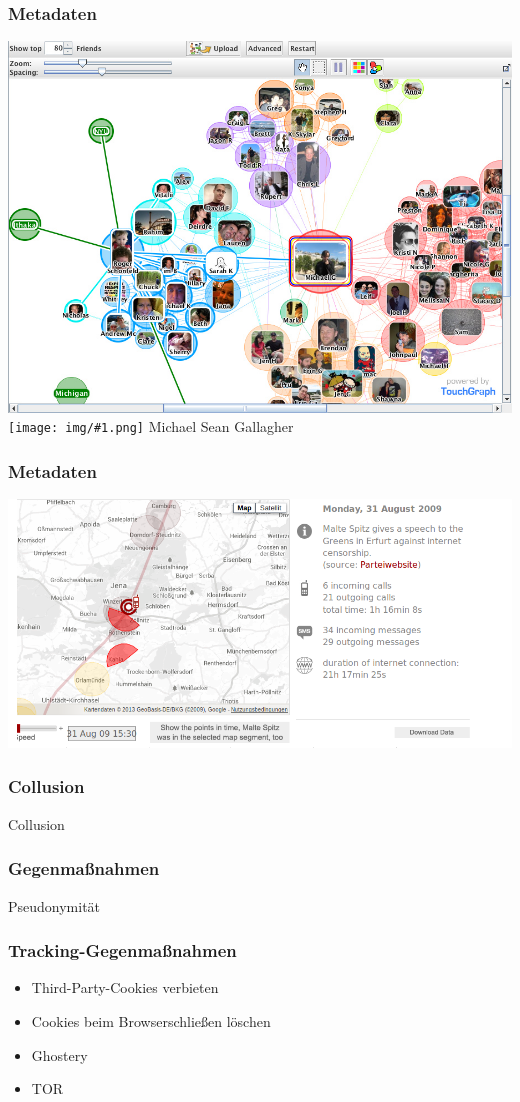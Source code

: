 \documentclass[12pt]{beamer}
\newcommand{\cc}[1]{\texttt{[image: img/\#1.png]}}
\begin{document}
\begin{frame}
    \frametitle{Metadaten}
    \includegraphics[height=0.7\textheight]{img/socialgraph.jpg}
    \cc{by-sa} Michael Sean Gallagher
\end{frame}

\begin{frame}
    \frametitle{Metadaten}
    \includegraphics[height=0.7\textheight]{img/maltespitz.png}
\end{frame}

\begin{frame}
    \frametitle{Collusion}
    \begin{center} \Large Collusion \end{center}
\end{frame}

\begin{frame}
    \frametitle{Gegenmaßnahmen}
    \begin{center} \Large Pseudonymität \end{center}
\end{frame}

\begin{frame}
    \frametitle{Tracking-Gegenmaßnahmen}
    \begin{itemize}
      \item<1-> Third-Party-Cookies verbieten
      \item<2-> Cookies beim Browserschließen löschen
      \item<3-> Ghostery
      \item<4-> TOR
    \end{itemize}
\end{frame}
\end{document}
